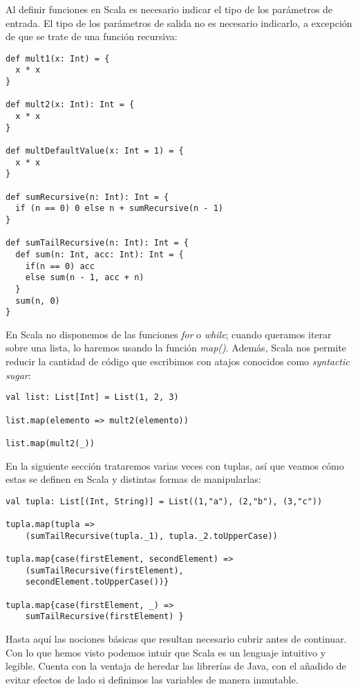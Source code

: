 Al definir funciones en Scala es necesario indicar el tipo de los parámetros de entrada. El tipo de los parámetros de salida no es necesario indicarlo, a excepción de que se trate de una función recursiva:\\

\begin{lstlisting}[frame=single]
def mult1(x: Int) = {
  x * x
}

def mult2(x: Int): Int = {
  x * x
}

def multDefaultValue(x: Int = 1) = {
  x * x
}

def sumRecursive(n: Int): Int = {
  if (n == 0) 0 else n + sumRecursive(n - 1)
}

def sumTailRecursive(n: Int): Int = {
  def sum(n: Int, acc: Int): Int = {
    if(n == 0) acc
    else sum(n - 1, acc + n)
  }
  sum(n, 0)
}
\end{lstlisting}

En Scala no disponemos de las funciones \textit{for} o \textit{while}; cuando queramos iterar sobre una lista, lo haremos usando la función \textit{map()}. Además, Scala nos permite reducir la cantidad de código que escribimos con atajos conocidos como \textit{syntactic sugar}:

\begin{lstlisting}[frame=single]
val list: List[Int] = List(1, 2, 3)

list.map(elemento => mult2(elemento))

list.map(mult2(_))
\end{lstlisting}

En la siguiente sección trataremos varias veces con tuplas, así que veamos cómo estas se definen en Scala y distintas formas de manipularlas:

\begin{lstlisting}[frame=single]
val tupla: List[(Int, String)] = List((1,"a"), (2,"b"), (3,"c"))

tupla.map(tupla => 
	(sumTailRecursive(tupla._1), tupla._2.toUpperCase))

tupla.map{case(firstElement, secondElement) => 
	(sumTailRecursive(firstElement), 
	secondElement.toUpperCase())}

tupla.map{case(firstElement, _) => 
	sumTailRecursive(firstElement) }

\end{lstlisting}

Hasta aquí las nociones básicas que resultan necesario cubrir antes de continuar. Con lo que hemos visto podemos intuir que Scala es un lenguaje intuitivo y legible. Cuenta con la ventaja de heredar las librerías de Java, con el añadido de evitar efectos de lado si definimos las variables de manera inmutable.\\

